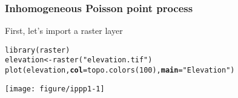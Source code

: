 \documentclass[color=usenames,dvipsnames]{beamer}\usepackage[]{graphicx}\usepackage[]{color}
\makeatletter
\newcommand{\hlnum}[1]{\textcolor[rgb]{0.69,0.494,0}{#1}}%
\newcommand{\hlstr}[1]{\textcolor[rgb]{0.749,0.012,0.012}{#1}}%
\newcommand{\hlstd}[1]{\textcolor[rgb]{0,0,0}{#1}}%
\newcommand{\hlkwb}[1]{\textcolor[rgb]{0,0.341,0.682}{#1}}%
\newcommand{\hlkwc}[1]{\textcolor[rgb]{0,0,0}{\textbf{#1}}}%
\newcommand{\hlkwd}[1]{\textcolor[rgb]{0.004,0.004,0.506}{#1}}%
\newenvironment{kframe}{%
 \def\at@end@of@kframe{}%
 \ifinner\ifhmode%
  \def\at@end@of@kframe{\end{minipage}}%
  \begin{minipage}{\columnwidth}%
 \fi\fi%
 \def\FrameCommand##1{\hskip\@totalleftmargin \hskip-\fboxsep
 \colorbox{shadecolor}{##1}\hskip-\fboxsep
     \hskip-\linewidth \hskip-\@totalleftmargin \hskip\columnwidth}%
 \MakeFramed {\advance\hsize-\width
   \@totalleftmargin\z@ \linewidth\hsize
   \@setminipage}}%
 {\par\unskip\endMakeFramed%
 \at@end@of@kframe}
\newenvironment{knitrout}{}{} %
\makeatother
\begin{document}
\begin{frame}[fragile]
  \frametitle{Inhomogeneous Poisson point process}
  First, let's import a raster layer
\begin{knitrout}\footnotesize
{}\color{fgcolor}\begin{kframe}
\begin{alltt}
\hlkwd{library}\hlstd{(raster)}
\hlstd{elevation} \hlkwb{<-} \hlkwd{raster}\hlstd{(}\hlstr{"elevation.tif"}\hlstd{)}
\hlkwd{plot}\hlstd{(elevation,} \hlkwc{col}\hlstd{=}\hlkwd{topo.colors}\hlstd{(}\hlnum{100}\hlstd{),} \hlkwc{main}\hlstd{=}\hlstr{"Elevation"}\hlstd{)}
\end{alltt}
\end{kframe}

{\centering \texttt{[image: figure/ippp1-1]} 

}


\end{knitrout}
\end{frame}




\end{document}
